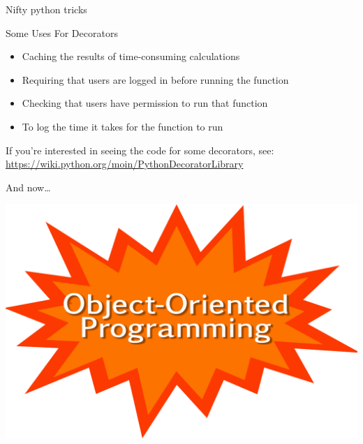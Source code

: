 \documentclass[aspectratio=149] {beamer}
\begin{document}
\begin{frame}[fragile]{Nifty python tricks}

  {\large Some Uses For Decorators}


  \begin{itemize}
    \item Caching the results of time-consuming calculations
    \item Requiring that users are logged in before running the function
    \item Checking that users have permission to run that function
    \item To log the time it takes for the function to run
  \end{itemize}

  If you're interested in seeing the code for some decorators,
  see: \url{https://wiki.python.org/moin/PythonDecoratorLibrary}

\end{frame}





{
\begin{frame}{And now\dots}
  \vspace{-5ex} \pause
  \begin{center}  
    \includegraphics[scale=.6]{starburstsf}
  \end{center}
\end{frame}
}
\end{document}
